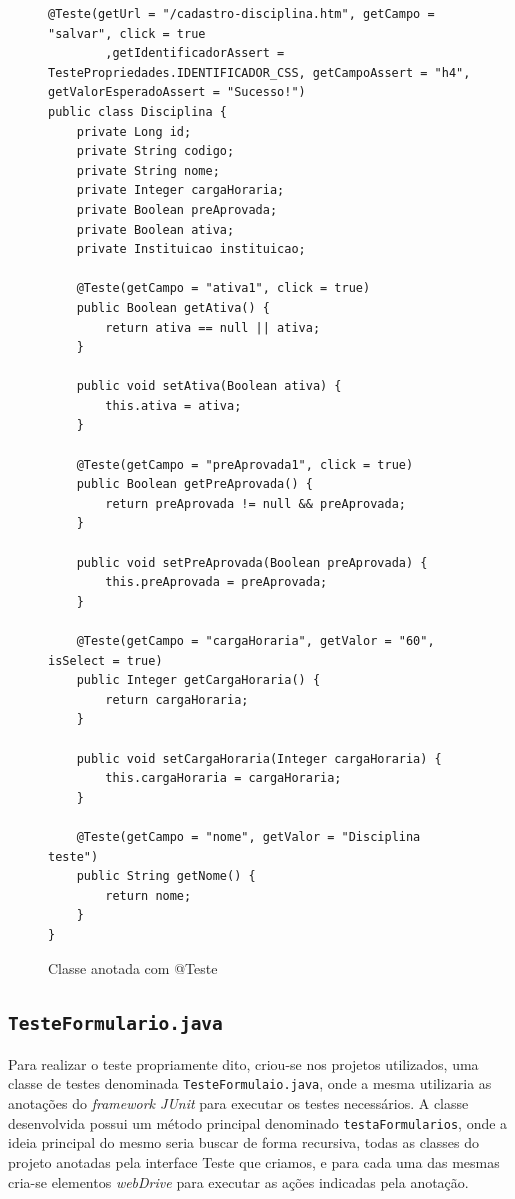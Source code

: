 \documentclass[tg]{mdtufsm}
\begin{document}
\begin{figure}[!htb]
\begin{lstlisting}
@Teste(getUrl = "/cadastro-disciplina.htm", getCampo = "salvar", click = true
        ,getIdentificadorAssert = TestePropriedades.IDENTIFICADOR_CSS, getCampoAssert = "h4", getValorEsperadoAssert = "Sucesso!")
public class Disciplina {
    private Long id;
    private String codigo;
    private String nome;
    private Integer cargaHoraria;
    private Boolean preAprovada;
    private Boolean ativa;
    private Instituicao instituicao;
   
    @Teste(getCampo = "ativa1", click = true)
    public Boolean getAtiva() {
        return ativa == null || ativa;
    }

    public void setAtiva(Boolean ativa) {
        this.ativa = ativa;
    }

    @Teste(getCampo = "preAprovada1", click = true)
    public Boolean getPreAprovada() {
        return preAprovada != null && preAprovada;
    }

    public void setPreAprovada(Boolean preAprovada) {
        this.preAprovada = preAprovada;
    }

    @Teste(getCampo = "cargaHoraria", getValor = "60", isSelect = true)
    public Integer getCargaHoraria() {
        return cargaHoraria;
    }

    public void setCargaHoraria(Integer cargaHoraria) {
        this.cargaHoraria = cargaHoraria;
    }

    @Teste(getCampo = "nome", getValor = "Disciplina teste")
    public String getNome() {
        return nome;
    }
}
\end{lstlisting}
	\caption{Classe anotada com @Teste}
	\label{code:Disciplina.java}
\end{figure}

\subsection{\texttt{TesteFormulario.java}}
Para realizar o teste propriamente dito, criou-se nos projetos utilizados, uma classe de testes denominada \texttt{TesteFormulaio.java}, onde a mesma utilizaria as anotações do \emph{framework JUnit}  para executar os testes necessários. A classe desenvolvida possui um método principal denominado \texttt{testaFormularios}, onde a ideia principal do mesmo seria buscar de forma recursiva, todas as classes do projeto anotadas pela interface Teste que criamos, e para cada uma das mesmas cria-se elementos \emph{webDrive} para executar as ações indicadas pela anotação. 
\end{document}

